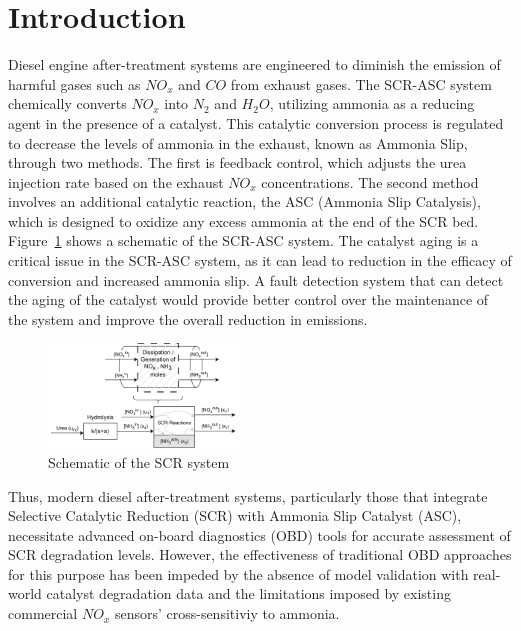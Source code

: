 \section{Introduction}

Diesel engine after-treatment systems are engineered to diminish the emission of
harmful gases such as $NO_x$ and $CO$ from exhaust gases. The SCR-ASC system
chemically converts $NO_x$ into $N_2$ and $H_2O$, utilizing ammonia as a reducing agent
in the presence of a catalyst. This catalytic conversion process is regulated to
decrease the levels of ammonia in the exhaust, known as Ammonia Slip, through
two methods. The first is feedback control, which adjusts the urea injection
rate based on the exhaust $NO_x$ concentrations. The second method involves an
additional catalytic reaction, the ASC (Ammonia Slip Catalysis), which is
designed to oxidize any excess ammonia at the end of the SCR bed.
Figure~\ref{fig:exhaust_scheme} shows a schematic of the SCR-ASC system. The
catalyst aging is a critical issue in the SCR-ASC system, as it can lead to
reduction in the efficacy of conversion and increased ammonia slip. A
fault detection system that can detect the aging of the catalyst would provide
better control over the maintenance of the system and improve the overall
reduction in emissions.

\begin{figure}[ht]
    \centering
    \includegraphics[width=0.45\textwidth]{./figs/scr_sys/SCR_sys.png}
    \caption{Schematic of the SCR system}
    \label{fig:exhaust_scheme}
\end{figure}


Thus, modern diesel after-treatment systems, particularly those that integrate
Selective Catalytic Reduction (SCR) with Ammonia Slip Catalyst (ASC),
necessitate advanced on-board diagnostics (OBD) tools for accurate assessment of
SCR degradation levels. However, the effectiveness of traditional OBD approaches
for this purpose has been impeded by the absence of model validation with
real-world catalyst degradation data and the limitations imposed by existing
commercial $NO_x$ sensors' cross-sensitiviy to ammonia.

